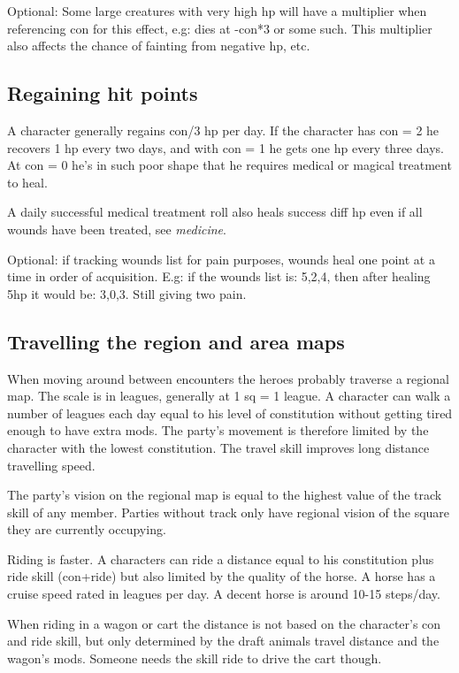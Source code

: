 Optional: Some large creatures with very high hp will have a multiplier when referencing con for this effect, e.g: dies at -con*3 or some such. This multiplier also affects the chance of fainting from negative hp, etc.


\subsection*{Regaining hit points}
A character generally regains con/3 hp per day. If the character has con = 2 he recovers 1 hp every two days, and with con = 1 he gets one hp every three days. At con = 0 he's in such poor shape that he requires medical or magical treatment to heal.

A daily successful medical treatment roll also heals success diff hp even if all wounds have been treated, see \emph{medicine}.

Optional: if tracking wounds list for pain purposes, wounds heal one point at a time in order of acquisition. E.g: if the wounds list is: 5,2,4, then after healing 5hp it would be: 3,0,3. Still giving two pain.


\subsection*{Travelling the region and area maps}
When moving around between encounters the heroes probably traverse a regional map. The scale is in leagues, generally at 1 sq = 1 league. A character can walk a number of leagues each day equal to his level of constitution without getting tired enough to have extra mods. The party's movement is therefore limited by the character with the lowest constitution. The travel skill improves long distance travelling speed.

The party's vision on the regional map is equal to the highest value of the track skill of any member. Parties without track only have regional vision of the square they are currently occupying.

Riding is faster. A characters can ride a distance equal to his constitution plus ride skill (con+ride) but also limited by the quality of the horse. A horse has a cruise speed rated in leagues per day. A decent horse is around 10-15 steps/day.

When riding in a wagon or cart the distance is not based on the character's con and ride skill, but only determined by the draft animals travel distance and the wagon's mods. Someone needs the skill ride to drive the cart though.

